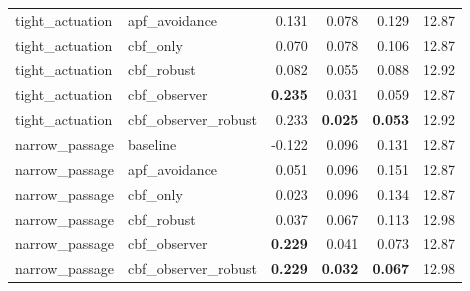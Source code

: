 \begin{table}[t]
{\begin{tabular}{llrrrr}
tight\_actuation & apf\_avoidance & 0.131 & 0.078 & 0.129 & 12.87 \\
tight\_actuation & cbf\_only & 0.070 & 0.078 & 0.106 & 12.87 \\
tight\_actuation & cbf\_robust & 0.082 & 0.055 & 0.088 & 12.92 \\
tight\_actuation & cbf\_observer & \textbf{0.235} & 0.031 & 0.059 & 12.87 \\
tight\_actuation & cbf\_observer\_robust & 0.233 & \textbf{0.025} & \textbf{0.053} & 12.92 \\
narrow\_passage & baseline & -0.122 & 0.096 & 0.131 & 12.87 \\
narrow\_passage & apf\_avoidance & 0.051 & 0.096 & 0.151 & 12.87 \\
narrow\_passage & cbf\_only & 0.023 & 0.096 & 0.134 & 12.87 \\
narrow\_passage & cbf\_robust & 0.037 & 0.067 & 0.113 & 12.98 \\
narrow\_passage & cbf\_observer & \textbf{0.229} & 0.041 & 0.073 & 12.87 \\
narrow\_passage & cbf\_observer\_robust & \textbf{0.229} & \textbf{0.032} & \textbf{0.067} & 12.98 \\
\bottomrule
\end{tabular}%
}
\end{table}
